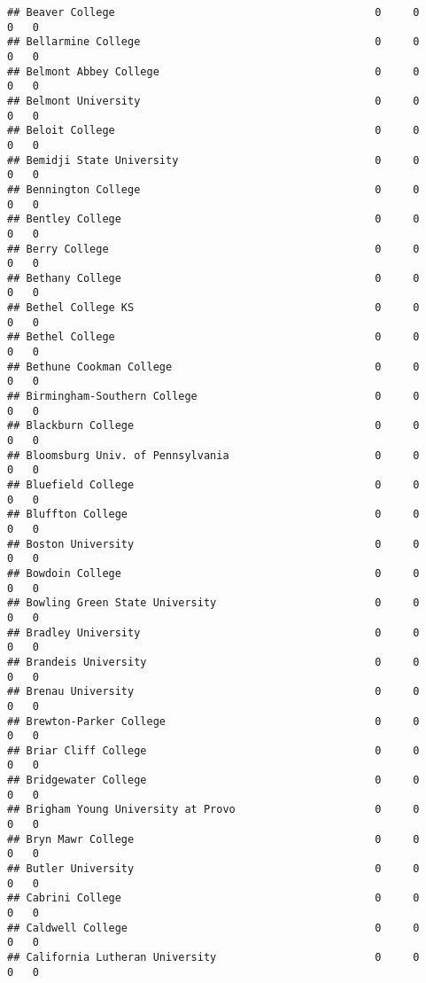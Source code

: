 \documentclass[
]{article}
\begin{document}
\begin{verbatim}
## Beaver College                                         0     0        0   0
## Bellarmine College                                     0     0        0   0
## Belmont Abbey College                                  0     0        0   0
## Belmont University                                     0     0        0   0
## Beloit College                                         0     0        0   0
## Bemidji State University                               0     0        0   0
## Bennington College                                     0     0        0   0
## Bentley College                                        0     0        0   0
## Berry College                                          0     0        0   0
## Bethany College                                        0     0        0   0
## Bethel College KS                                      0     0        0   0
## Bethel College                                         0     0        0   0
## Bethune Cookman College                                0     0        0   0
## Birmingham-Southern College                            0     0        0   0
## Blackburn College                                      0     0        0   0
## Bloomsburg Univ. of Pennsylvania                       0     0        0   0
## Bluefield College                                      0     0        0   0
## Bluffton College                                       0     0        0   0
## Boston University                                      0     0        0   0
## Bowdoin College                                        0     0        0   0
## Bowling Green State University                         0     0        0   0
## Bradley University                                     0     0        0   0
## Brandeis University                                    0     0        0   0
## Brenau University                                      0     0        0   0
## Brewton-Parker College                                 0     0        0   0
## Briar Cliff College                                    0     0        0   0
## Bridgewater College                                    0     0        0   0
## Brigham Young University at Provo                      0     0        0   0
## Bryn Mawr College                                      0     0        0   0
## Butler University                                      0     0        0   0
## Cabrini College                                        0     0        0   0
## Caldwell College                                       0     0        0   0
## California Lutheran University                         0     0        0   0

\end{verbatim}
\end{document}
